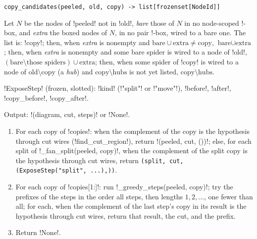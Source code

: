 \begin{signature}
\texttt{copy\_\allowbreak{}candidates(\allowbreak{}peeled,\allowbreak{} old,\allowbreak{} copy) -> list[frozenset[NodeId]]}

Let $N$ be the nodes of \code!peeled! not in \code!old!, \emph{bare} those of $N$ in no node-scoped !-box, and \emph{extra} the boxed nodes of $N$, in no pair !-box, wired to a bare one. The list is: \code!copy!; then, when \emph{extra} is nonempty and $\text{bare}\cup\text{extra}\neq\text{copy}$, $\text{bare}\cup\text{extra}$; then, when \emph{extra} is nonempty and some bare spider is wired to a node of \code!old!, $(\text{bare}\setminus\text{those spiders})\cup\text{extra}$; then, when some spider of \code!copy! is wired to a node of $\text{old}\setminus\text{copy}$ (a \emph{hub}) and $\text{copy}\setminus\text{hubs}$ is not yet listed, $\text{copy}\setminus\text{hubs}$.
\end{signature}

\begin{signature}
\py!ExposeStep! (frozen, slotted): \py!kind! (\code!"split"! or \code!"move"!), \py!before!, \py!after!, \py!copy_before!, \py!copy_after!.
\end{signature}

\begin{algorithm}\label{alg:kernel-expose-cut}
Output: \py!(diagram, cut, steps)! or \py!None!.
\begin{enumerate}
\item For each copy of \code!copies!: when the complement of the copy is the hypothesis through cut wires (\py!find_cut_region!), return \py!(peeled, cut, ())!; else, for each split of \py!_fan_split(peeled, copy)!, when the complement of the split copy is the hypothesis through cut wires, return \texttt{(\allowbreak{}split,\allowbreak{} cut,\allowbreak{} (\allowbreak{}ExposeStep(\allowbreak{}"split",\allowbreak{} .\allowbreak{}.\allowbreak{}.\allowbreak{}),))}.
\item For each copy of \code!copies[1:]!: run \py!_greedy_steps(peeled, copy)!; try the prefixes of the steps in the order all steps, then lengths $1, 2, \ldots$, one fewer than all; for each, when the complement of the last step's copy in its result is the hypothesis through cut wires, return that result, the cut, and the prefix.
\item Return \py!None!.
\end{enumerate}
\end{algorithm}

